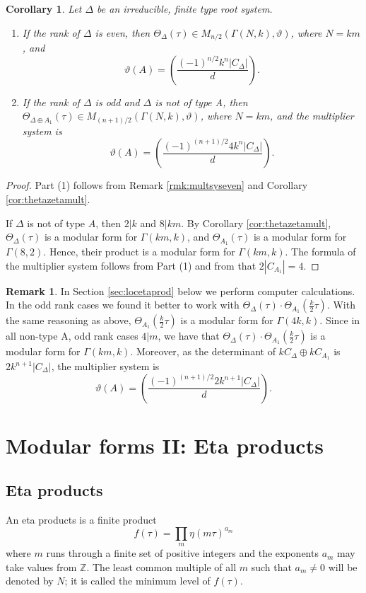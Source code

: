 \documentclass{article}
\newtheorem{corollary}[theorem]{Corollary}
\theoremstyle{definition}
\newtheorem{remark}[theorem]{Remark}
\newcommand{\ZZ} {{\mathbb Z}}		%
\begin{document}
\begin{corollary} Let $\Delta$ be an irreducible, finite type root system.
\begin{enumerate}
\item If the rank of $\Delta$ is even, then 
$\Theta_{\Delta}(\tau) \in M_{n/2}(\Gamma(N,k), \vartheta)$, where $N=km$, and 
\[ \vartheta(A)= \left( \frac{(-1)^{n/2} k^n |C_{\Delta}|}{d} \right). \]
\item If the rank of $\Delta$ is odd and $\Delta$ is not of type A, then 
$\Theta_{\Delta\oplus A_1}(\tau) \in M_{(n+1)/2}(\Gamma(N,k), \vartheta)$, 
where $N=km$, and the multiplier system is
\[ \vartheta(A)= \left( \frac{(-1)^{(n+1)/2} 4k^n|C_{\Delta}|}{d} \right). \]
\end{enumerate}
\end{corollary}
\begin{proof} Part (1) follows from Remark \ref{rmk:multsyseven} and Corollary \ref{cor:thetazetamult}.
	
If $\Delta$ is not of type $A$, then $2|k$ and $8|km$. By Corollary \ref{cor:thetazetamult}, 
$\Theta_{\Delta}(\tau) $ is a modular form for $\Gamma(km,k)$, and  $\Theta_{A_1}(\tau)$ is 
a modular form for $\Gamma(8,2)$. Hence, their product is a modular form for $\Gamma(km,k)$. 
The formula of the multiplier system follows from Part (1) and from that $2|C_{A_1}|=4$.
\end{proof}

\begin{remark}
In Section \ref{sec:locetaprod} below we perform computer calculations. In the odd rank 
cases we found it better to work with $\Theta_{\Delta}(\tau)\cdot 
\Theta_{A_1}(\frac{k}{2}\tau)$. With the same reasoning as above, 
$\Theta_{A_1}(\frac{k}{2}\tau)$ is a modular form for $\Gamma(4k,k)$. Since in all non-type 
A, odd rank cases $4|m$, we have that $\Theta_{\Delta}(\tau)\cdot 
\Theta_{A_1}(\frac{k}{2}\tau)$ is a modular form for $\Gamma(km,k)$. Moreover, as the 
determinant of $kC_{\Delta} \oplus k C_{A_1}$ is $2k^{n+1}|C_{\Delta}|$, the multiplier 
system is
	\[ \vartheta(A)= \left( \frac{(-1)^{(n+1)/2} 2k^{n+1}|C_{\Delta}|}{d} \right). \]
\end{remark}

\section{Modular forms II: Eta products}
\label{sec:modformIIetaprod}

\subsection{Eta products}
An eta products is a finite product
\begin{equation} f(\tau)=\prod_m \eta(m \tau )^{a_m} 
\label{eq:etaproddef}
\end{equation}
where $m$ runs through a finite set of positive integers and the exponents
$a_m$ may take values from $\ZZ$. The least common multiple of all $m$ such that $a_m\neq 0$ will be denoted by $N$; it is called the minimum level of $f(\tau)$.
\end{document}
